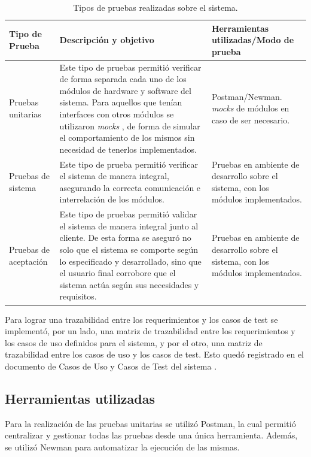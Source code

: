 \begin{table}[h]
	\centering
	\caption[Tipos de pruebas]{Tipos de pruebas realizadas sobre el sistema.}
	\begin{tabular}{p{3.0cm} p{5.5cm} p{4.0cm}} 	

		\toprule
		\textbf{Tipo de Prueba} & 
		\textbf{Descripción y objetivo } & 
		\textbf{Herramientas utilizadas/Modo de prueba} 
		\\
		\midrule
Pruebas unitarias  &
Este tipo de pruebas permitió verificar de forma separada cada uno de los módulos de hardware y software del sistema. Para aquellos que tenían interfaces con otros módulos se utilizaron \textit{mocks} \citep{WEBSITE:Mocks}, de forma de simular el comportamiento de los mismos sin necesidad de tenerlos implementados.		
		   & Postman/Newman. \textit{mocks} de módulos en caso de ser necesario. \\	
Pruebas de sistema &
Este tipo de prueba permitió verificar el sistema de manera integral, asegurando la correcta comunicación e interrelación de los módulos. &
Pruebas en ambiente de desarrollo sobre el sistema, con los módulos implementados. \\		Pruebas de aceptación &
Este tipo de pruebas permitió validar el sistema de manera integral junto al cliente. De esta forma se aseguró no solo que el sistema se comporte según lo especificado y desarrollado, sino que el usuario final corrobore que el sistema actúa según sus necesidades y requisitos. &
Pruebas en ambiente de desarrollo sobre el sistema, con los módulos implementados.	\\   
		   
		   	
		\bottomrule
		\hline
	\end{tabular}
	\label{tab:tablaTiposPruebas}
\end{table}

Para lograr una trazabilidad entre los requerimientos y los casos de test se implementó, por un lado, una matriz de trazabilidad entre los requerimientos y los casos de uso definidos para el sistema, y por el otro, una matriz de trazabilidad entre los casos de uso y los casos de test. Esto quedó registrado en el documento de Casos de Uso y Casos de Test del sistema \citep{WEBSITE:CasosUsoYTest}.

\pagebreak
\subsection{Herramientas utilizadas}

Para la realización de las pruebas unitarias se utilizó Postman, la cual permitió centralizar y gestionar todas las pruebas desde una única herramienta. Además, se utilizó Newman para automatizar la ejecución de las mismas.

